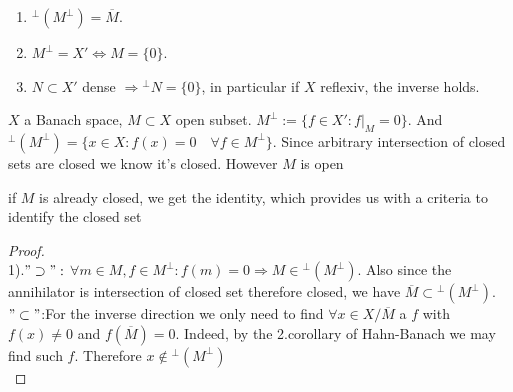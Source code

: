 \begin{lemma}\quad
	\begin{enumerate}
		\item ${}^\perp(M^\perp) = \overline{M}$.
		\item $M^\perp = X' \Leftrightarrow M = \{0\}$.
		\item $N \subset X'$ dense $\Rightarrow {}^\perp N = \{0\}$, in particular if $X$ reflexiv, the inverse holds.
	\end{enumerate}
\end{lemma}
\begin{example}
	$X$ a Banach space, $M\subset X$ open subset. $M^\perp := \{f \in X': f|_M  = 0 \}$. And ${}^\perp (M^\perp) = \{x \in X: f(x) = 0 \quad \forall f \in M^\perp \}$. Since arbitrary intersection of closed sets are closed we know it's closed. However $M$ is open 
\end{example}
\begin{remark}
if $M$ is already closed, we get the identity, which provides us with a criteria to identify the closed set	
\end{remark}

\begin{proof}
	\quad\\
	1).$"\supset":$ $\forall m \in M, f \in M^\perp: f(m) = 0 \Rightarrow M \in {}^\perp (M^\perp)$. Also since the annihilator is intersection of closed set therefore closed, we have $\overline{M} \subset {}^\perp (M^\perp)$.\\
	$"\subset"$:For the inverse direction we only need to find $\forall x  \in X\slash \overline{M}$ a $f$ with $f(x) \neq 0$ and $f(\overline{M}) = 0$. Indeed, by the 2.corollary of Hahn-Banach we may find such $f$. Therefore $x \notin {}^\perp (M^\perp)$\\
\end{proof}


	


